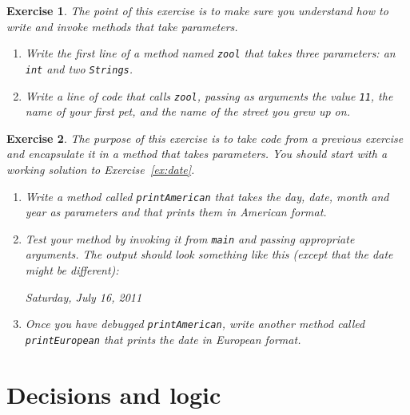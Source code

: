 \documentclass[12pt]{book}
\theoremstyle{exercise}
\newtheorem{exercise}{Exercise}[chapter]
\newcommand{\java}[1]{\verb"#1"}
\newcommand{\java}[1]{\lstinline{#1}} %
\begin{document}
\begin{exercise}

The point of this exercise is to make sure you understand how to write and invoke methods that take parameters.

\begin{enumerate}
\item Write the first line of a method named \java{zool} that takes three parameters: an \java{int} and two \java{Strings}.

\item Write a line of code that calls \java{zool}, passing as arguments the value \java{11}, the name of your first pet, and the name of the street you grew up on.
\end{enumerate}

\end{exercise}


\begin{exercise}

The purpose of this exercise is to take code from a previous exercise and encapsulate it in a method that takes parameters.
You should start with a working solution to Exercise~\ref{ex:date}.

\begin{enumerate}

\item Write a method called \java{printAmerican} that takes the day, date, month and year as parameters and that prints them in American format.

\item Test your method by invoking it from \java{main} and passing appropriate arguments.
The output should look something like this (except that the date might be different):

\begin{stdout}
Saturday, July 16, 2011
\end{stdout}

\item Once you have debugged \java{printAmerican}, write another method called \java{printEuropean} that prints the date in European format.

\end{enumerate}

\end{exercise}


\chapter{Decisions and logic}
\end{document}
